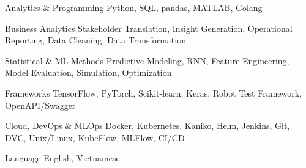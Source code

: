 

\begin{cvskills}

  \cvskill
    {Analytics \& Programming} %
    {Python, SQL, pandas, MATLAB, Golang} %

  \cvskill
    {Business Analytics} %
    {Stakeholder Translation, Insight Generation, Operational Reporting, Data Cleaning, Data Transformation} %

  \cvskill
    {Statistical \& ML Methods} %
    {Predictive Modeling, RNN, Feature Engineering, Model Evaluation, Simulation, Optimization} %

  \cvskill
    {Frameworks} %
    {TensorFlow, PyTorch, Scikit-learn, Keras, Robot Test Framework, OpenAPI/Swagger} %

  \cvskill
    {Cloud, DevOps \& MLOps} %
    {Docker, Kubernetes, Kaniko, Helm, Jenkins, Git, DVC, Unix/Linux, 
    KubeFlow, MLFlow, CI/CD} %
    
  \cvskill
    {Language} %
    {English, Vietnamese}

\end{cvskills}

